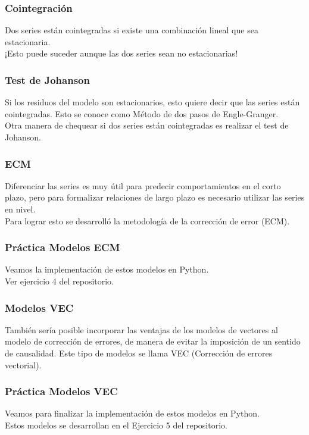 \documentclass{beamer}
\begin{document}
\begin{frame}
\frametitle{Cointegración}
Dos series están cointegradas si existe una combinación lineal que sea estacionaria.\\
\vspace{5mm} %
¡Esto puede suceder aunque las dos series sean no estacionarias! 
\end{frame}


\begin{frame}
\frametitle{Test de Johanson}
Si los residuos del modelo son estacionarios, esto quiere decir que las series están cointegradas. Esto se conoce como Método de dos pasos de Engle-Granger.  \\
\vspace{5mm} %
Otra manera de chequear si dos series están cointegradas es realizar el test de Johanson. 
\end{frame}



\begin{frame}
\frametitle{ECM}
Diferenciar las series es muy útil para predecir comportamientos en el corto plazo, pero para formalizar relaciones de largo plazo es necesario utilizar las series en nivel.\\
\vspace{5mm} %
Para lograr esto se desarrolló la metodología de la corrección de error (ECM).  
\end{frame}

\begin{frame}
\frametitle{Práctica Modelos ECM}
Veamos la implementación de estos modelos en Python. \\
\vspace{5mm} %
Ver ejercicio 4 del repositorio.\\
\end{frame}

\begin{frame}
\frametitle{Modelos VEC}
También sería posible incorporar las ventajas de los modelos de vectores al modelo de corrección de errores, de manera de evitar la imposición de un sentido de causalidad. Este tipo de modelos se llama VEC (Corrección de errores vectorial). 
\end{frame}


\begin{frame}
\frametitle{Práctica Modelos VEC}
Veamos para finalizar la implementación de estos modelos en Python. \\
\vspace{5mm} %
Estos modelos se desarrollan en el Ejercicio 5 del repositorio.\\
\end{frame}
\end{document}
